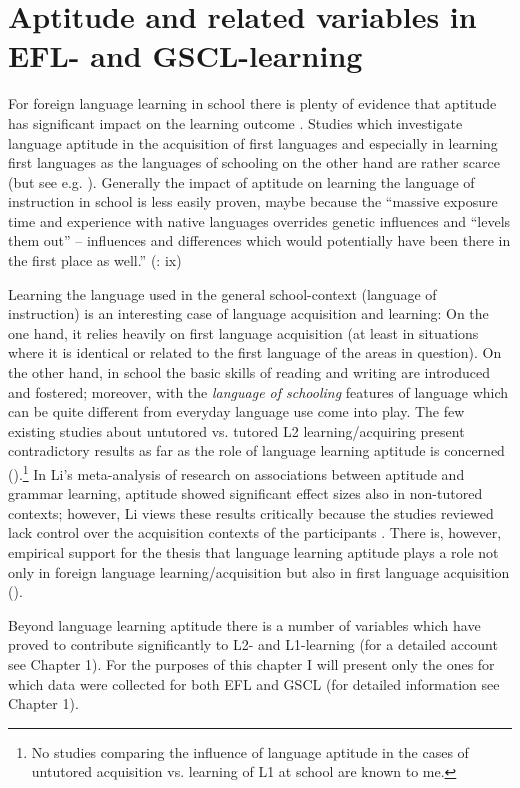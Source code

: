 \documentclass[output=paper]{langsci/langscibook}
\begin{document}
\section{Aptitude and related variables in EFL- and GSCL-learning}\label{sec:09:2}

For foreign language learning in school there is plenty of evidence that aptitude has significant impact on the learning outcome \citep{Li2015}. Studies which investigate language aptitude in the acquisition of first languages and especially in learning first languages as the languages of schooling on the other hand are rather scarce (but see e.g. \citealt{SkehanDucroquet1988}). Generally the impact of aptitude on learning the language of instruction in school is less easily proven, maybe because the “massive exposure time and experience with native languages overrides genetic influences and ``levels them out'' – influences and differences which would potentially have been there in the first place as well.” (\citealt{Reiterer2018}: ix)

Learning the language used in the general school-context (language of instruction) is an interesting case of language acquisition and learning: On the one hand, it relies heavily on first language acquisition (at least in situations where it is identical or related to the first language of the areas in question). On the other hand, in school the basic skills of reading and writing are introduced and fostered; moreover, with the \textit{language of schooling} \citep{Schleppegrell2004} features of language which can be quite different from everyday language use come into play. The few existing studies about untutored vs. tutored L2 learning/acquiring present contradictory results as far as the role of language learning aptitude is concerned (\citealt{UdryEtAl2019}).\footnote{No studies comparing the influence of language aptitude in the cases of untutored acquisition vs. learning of L1 at school are known to me.} In Li’s meta-analysis of research on associations between aptitude and grammar learning, aptitude showed significant effect sizes also in non-tutored contexts; however, Li views these results critically because the studies reviewed lack control over the acquisition contexts of the participants \citep[405]{Li2015}. There is, however, empirical support for the thesis that language learning aptitude plays a role not only in foreign language learning/acquisition but also in first language acquisition (\citealt{BiedronPawlak2016}).

Beyond language learning aptitude there is a number of variables which have proved to contribute significantly to L2- and L1-learning (for a detailed account see Chapter 1). For the purposes of this chapter I will present only the ones for which data were collected for both EFL and GSCL (for detailed information see Chapter 1).
\end{document}
